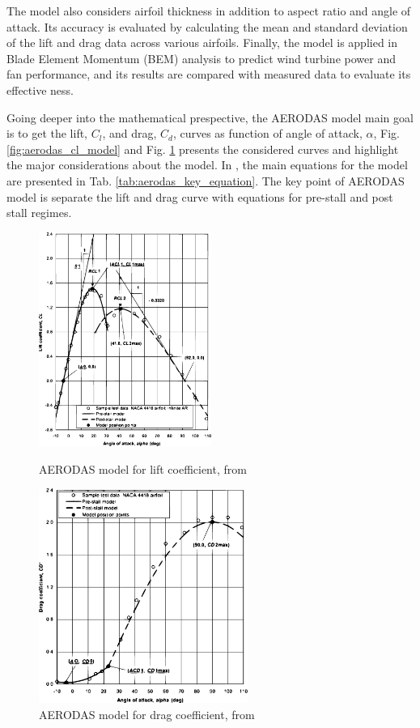 The model also considers airfoil thickness in addition to aspect ratio and angle of attack. Its accuracy is evaluated by calculating the mean and standard deviation of the lift and drag data across various airfoils. Finally, the model is applied in Blade Element Momentum (BEM) analysis to predict wind turbine power and fan performance, and its results are compared with measured data to evaluate its effective
ness.

Going deeper into the mathematical prespective, the AERODAS model main goal is to get the lift, $C_l$, and drag, $C_d$, curves as function of angle of attack, $\alpha$, Fig. \ref{fig:aerodas_cl_model} and Fig. \ref{fig:aerodas_cd_model} presents the considered curves and highlight the major considerations about the model. In \cite{spera_models_2008}, the main equations for the model are presented in Tab. \ref{tab:aerodas_key_equation}. The key point of AERODAS model is separate the lift and drag curve with equations for pre-stall and post stall regimes.


\begin{figure}[!htb]
	\centering
	\begin{minipage}{0.45\textwidth}
		\centering
		\includegraphics[height=7cm]{Figures/background/aero/liftmodel_aerodas.eps}
		\caption{AERODAS model for lift coefficient, from \cite{spera_models_2008}}
		\label{fig:aerodas_cl_model}
	\end{minipage}
	\hfill
    \begin{minipage}{0.45\textwidth}
		\centering
		\includegraphics[height=7cm]{Figures/background/aero/dragmodel_aerodas.eps}
		\caption{AERODAS model for drag coefficient, from \cite{spera_models_2008}}
		\label{fig:aerodas_cd_model}
	\end{minipage}
\end{figure}

